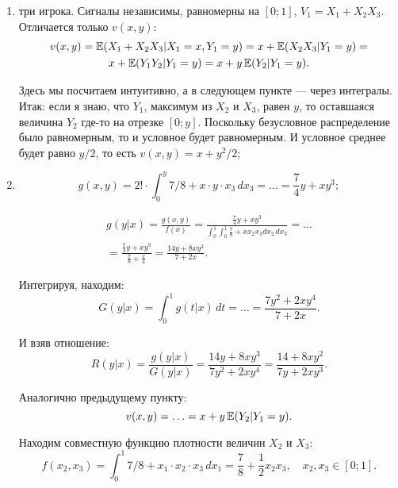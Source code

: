 \begin{enumerate}
\begin{enumerate}
\item три игрока. Сигналы независимы, равномерны на $ [0;1] $, $ V_{1}=X_{1}+X_{2}X_{3} $.
Отличается только $ v(x,y) $:
\begin{multline}
v(x,y)=\operatorname{\mathbb{E}}(X_{1}+X_{2}X_{3}|X_{1}=x,Y_{1}=y)=x+\operatorname{\mathbb{E}}(X_{2}X_{3}|Y_{1}=y)=\\
x+\operatorname{\mathbb{E}}(Y_{1}Y_{2}|Y_{1}=y)=x+y\operatorname{\mathbb{E}}(Y_{2}|Y_{1}=y).
\end{multline}

Здесь мы посчитаем интуитивно, а в следующем пункте — через ин\-тег\-ра\-лы. Итак: если я знаю, что $ Y_{1} $, максимум из $ X_{2} $ и $ X_{3} $, равен $ y $, то оставшаяся величина $ Y_{2} $ где-то на отрезке $[0;y] $. Поскольку безусловное распределение было равномерным, то и условное будет равномерным. И условное среднее будет равно $ y/2 $, то есть $ v(x,y)=x+y^{2}/2 $;


\item

\begin{equation}
g(x,y)=2!\cdot \int_{0}^{y} 7/8+x\cdot y\cdot x_{3} \, dx_{3} =
\ldots=\frac{7}{4}y+xy^{3};
\end{equation}

\begin{multline}
g(y|x)=\frac{g(x,y)}{f(x)}=\frac{\frac{7}{4}y+xy^{3}}{\int_{0}^{1}\int_{0}^{1} \frac{7}{8}+xx_{2}x_{3}dx_{2} \, dx_{3}}=\ldots\\
=\frac{\frac{7}{4}y+xy^{3}}{\frac{7}{8}+\frac{x}{4}}=\frac{14y+8xy^{3}}{7+2x}.
\end{multline}

Интегрируя, находим:
\begin{equation}
G(y|x)=\int_{0}^{1} g(t|x) \, dt=\ldots=\frac{7y^{2}+2xy^{4}}{7+2x}.
\end{equation}

И взяв отношение:
\begin{equation}
R(y|x)=\frac{g(y|x)}{G(y|x)}=\frac{14y+8xy^{3}}{7y^{2}+2xy^{4}}=\frac{14+8xy^{2}}{7y+2xy^{3}}.
\end{equation}

Аналогично предыдущему пункту:
\begin{equation}
v(x,y)=\ldots=x+y\operatorname{\mathbb{E}}(Y_{2}|Y_{1}=y).
\end{equation}



Находим совместную функцию плотности величин $ X_{2} $ и $ X_{3} $:
\begin{equation}
f(x_{2},x_{3})=\int_{0}^{1} 7/8+x_{1}\cdot x_{2}\cdot x_{3} \, dx_{1}=\frac{7}{8}+\frac{1}{2}x_{2}x_{3}, \quad x_{2},x_{3}\in [0;1].
\end{equation}


\end{enumerate}
\end{enumerate}
